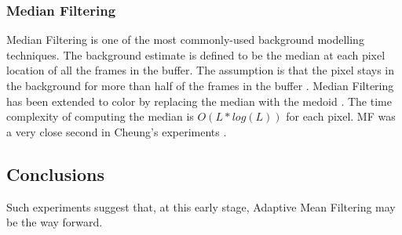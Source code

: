 \subsubsection{Median Filtering}
Median Filtering is one of the most commonly-used background modelling techniques. The background estimate is defined to be the median at each pixel location of all the frames in the buffer. The assumption is that the pixel stays in the background for more than half of the frames in the buffer \cite{Cheung2007}. Median Filtering has been extended to color by replacing the median with the medoid \cite{Cucchiara2003}. The time complexity of computing the median is $O(L*log(L))$ for each pixel. MF was a very close second in Cheung's experiments \cite{Cheung2007}.

\subsection{Conclusions}
Such experiments suggest that, at this early stage, Adaptive Mean Filtering may be the way forward.\\